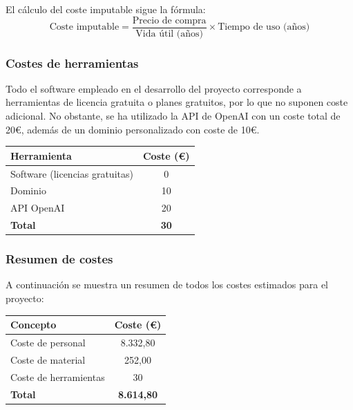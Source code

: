 \noindent El cálculo del coste imputable sigue la fórmula:
\begin{equation*}
\text{Coste imputable} = \frac{\text{Precio de compra}}{\text{Vida útil (años)}} \times \text{Tiempo de uso (años)}
\end{equation*}

\subsubsection{Costes de herramientas}

Todo el software empleado en el desarrollo del proyecto corresponde a herramientas de licencia gratuita o planes gratuitos, por lo que no suponen coste adicional. No obstante, se ha utilizado la API de OpenAI con un coste total de 20€, además de un dominio personalizado con coste de 10€.

\begin{center}
\begin{tabular}{|l|c|}
\hline
\textbf{Herramienta} & \textbf{Coste (€)} \\
\hline
Software (licencias gratuitas) & 0 \\
Dominio & 10 \\
API OpenAI & 20 \\
\hline
\textbf{Total} & \textbf{30} \\
\hline
\end{tabular}
\end{center}

\subsubsection{Resumen de costes}

A continuación se muestra un resumen de todos los costes estimados para el proyecto:

\begin{center}
\begin{tabular}{|l|c|}
\hline
\textbf{Concepto} & \textbf{Coste (€)} \\
\hline
Coste de personal & 8.332,80 \\
Coste de material & 252,00 \\
Coste de herramientas & 30 \\
\hline
\textbf{Total} & \textbf{8.614,80} \\
\hline
\end{tabular}
\end{center}